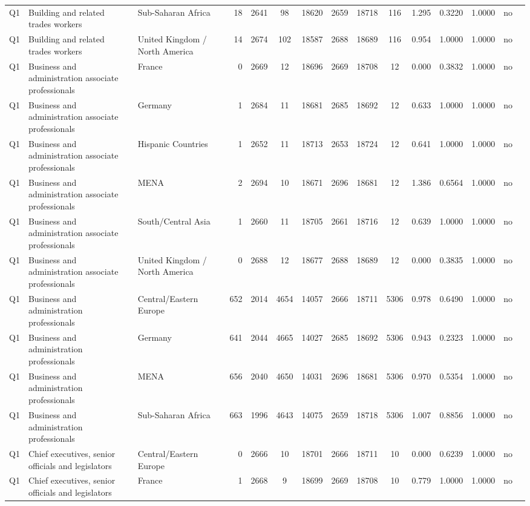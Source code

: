 \begin{longtable}{lllrcccccccccll}
Q1 & Building and related trades workers & Sub-Saharan Africa & 18 & 2641 & 98 & 18620 & 2659 & 18718 & 116 & 1.295 & 0.3220 & 1.0000 & no \\
Q1 & Building and related trades workers & United Kingdom / North America & 14 & 2674 & 102 & 18587 & 2688 & 18689 & 116 & 0.954 & 1.0000 & 1.0000 & no \\
Q1 & Business and administration associate professionals & France & 0 & 2669 & 12 & 18696 & 2669 & 18708 & 12 & 0.000 & 0.3832 & 1.0000 & no \\
Q1 & Business and administration associate professionals & Germany & 1 & 2684 & 11 & 18681 & 2685 & 18692 & 12 & 0.633 & 1.0000 & 1.0000 & no \\
Q1 & Business and administration associate professionals & Hispanic Countries & 1 & 2652 & 11 & 18713 & 2653 & 18724 & 12 & 0.641 & 1.0000 & 1.0000 & no \\
Q1 & Business and administration associate professionals & MENA & 2 & 2694 & 10 & 18671 & 2696 & 18681 & 12 & 1.386 & 0.6564 & 1.0000 & no \\
Q1 & Business and administration associate professionals & South/Central Asia & 1 & 2660 & 11 & 18705 & 2661 & 18716 & 12 & 0.639 & 1.0000 & 1.0000 & no \\
Q1 & Business and administration associate professionals & United Kingdom / North America & 0 & 2688 & 12 & 18677 & 2688 & 18689 & 12 & 0.000 & 0.3835 & 1.0000 & no \\
Q1 & Business and administration professionals & Central/Eastern Europe & 652 & 2014 & 4654 & 14057 & 2666 & 18711 & 5306 & 0.978 & 0.6490 & 1.0000 & no \\
Q1 & Business and administration professionals & Germany & 641 & 2044 & 4665 & 14027 & 2685 & 18692 & 5306 & 0.943 & 0.2323 & 1.0000 & no \\
Q1 & Business and administration professionals & MENA & 656 & 2040 & 4650 & 14031 & 2696 & 18681 & 5306 & 0.970 & 0.5354 & 1.0000 & no \\
Q1 & Business and administration professionals & Sub-Saharan Africa & 663 & 1996 & 4643 & 14075 & 2659 & 18718 & 5306 & 1.007 & 0.8856 & 1.0000 & no \\
Q1 & Chief executives, senior officials and legislators & Central/Eastern Europe & 0 & 2666 & 10 & 18701 & 2666 & 18711 & 10 & 0.000 & 0.6239 & 1.0000 & no \\
Q1 & Chief executives, senior officials and legislators & France & 1 & 2668 & 9 & 18699 & 2669 & 18708 & 10 & 0.779 & 1.0000 & 1.0000 & no \\

\end{longtable}

